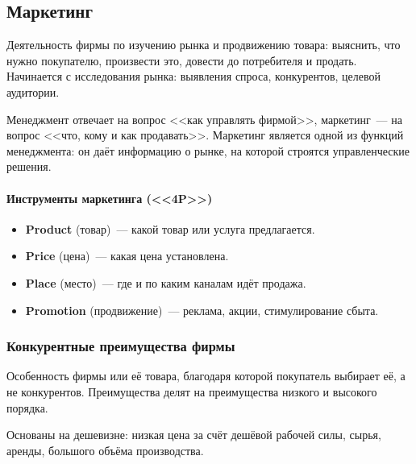 \documentclass[12pt]{article}
\begin{document}
	\subsection{Маркетинг}

	\begin{definition}[Маркетинг]
		Деятельность фирмы по изучению рынка и продвижению товара: выяснить, что нужно покупателю, произвести это, довести до потребителя и продать. Начинается с исследования рынка: выявления спроса, конкурентов, целевой аудитории.
	\end{definition}

	\begin{note}
		Менеджмент отвечает на вопрос <<как управлять фирмой>>, маркетинг~--- на вопрос <<что, кому и как продавать>>. Маркетинг является одной из функций менеджмента: он даёт информацию о рынке, на которой строятся управленческие решения.
	\end{note}

	\paragraph{Инструменты маркетинга (<<4P>>)}
	\begin{itemize}
		\item \textbf{Product} (товар)~--- какой товар или услуга предлагается.
		\item \textbf{Price} (цена)~--- какая цена установлена.
		\item \textbf{Place} (место)~--- где и по каким каналам идёт продажа.
		\item \textbf{Promotion} (продвижение)~--- реклама, акции, стимулирование сбыта.
	\end{itemize}

	\subsubsection{Конкурентные преимущества фирмы}
	
	\begin{definition}
		Особенность фирмы или её товара, благодаря которой покупатель выбирает её, а не конкурентов. Преимущества делят на преимущества низкого и высокого порядка.
	\end{definition}
	
	\begin{definition}
		Основаны на дешевизне: низкая цена за счёт дешёвой рабочей силы, сырья, аренды, большого объёма производства.
	\end{definition}
	
\end{document}
